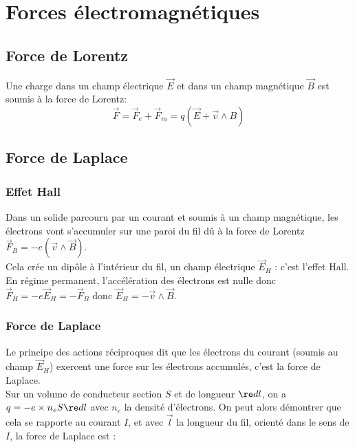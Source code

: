 \documentclass[13pt, twoside, a4paper, french]{report}
\begin{document}
\chapter{Forces électromagnétiques}


    \section{Force de Lorentz}

        Une charge dans un champ électrique $\vec E$ et dans un champ magnétique $\vec B$ est soumis à la force de Lorentz:\\

        \[\vec F = \vec F_e + \vec F_m = q (\vec E + \vec v \wedge B)\]


    \section{Force de Laplace}

        \subsection{Effet Hall}

            Dans un solide parcouru par un courant et soumis à un champ magnétique, les électrons vont s'accumuler sur une paroi du fil dû à la force de Lorentz $\vec F_B = -e (\vec v \wedge \vec B)$.\\

            Cela crée un dipôle à l'intérieur du fil, un champ électrique $\vec E_H$ : c'est l'effet Hall.\\
            En régime permanent, l'accélération des électrons est nulle donc $\vec F_H = -e \vec E_H = - \vec F_B$ donc $\vec E_H = - \vec v \wedge \vec B$.\\

        \subsection{Force de Laplace}

            Le principe des actions réciproques dit que les électrons du courant (soumis au champ $\vec E_H$) exercent une force sur les électrons accumulés, c'est la force de Laplace.\\

            Sur un volume de conducteur section $S$ et de longueur $\re d l$, on a $q = -e \times n_e S \re d l$ avec $n_e$ la densité d'électrons. On peut alors démontrer que cela se rapporte au courant $I$, et avec $\vec l$ la longueur du fil, orienté dans le sens de $I$, la force de Laplace est :
\end{document}
